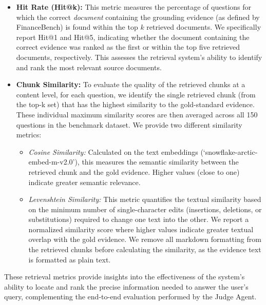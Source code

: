 \documentclass[final,5p,times,twopage,twocolumn,a4paper]{elsarticle}
\begin{document}
\begin{itemize}
    \item \textbf{Hit Rate (Hit@k):} This metric measures the percentage of questions for which the correct \textit{document} containing the grounding evidence (as defined by FinanceBench) is found within the top $k$ retrieved documents. We specifically report Hit@1 and Hit@5, indicating whether the document containing the correct evidence was ranked as the first or within the top five retrieved documents, respectively. This assesses the retrieval system's ability to identify and rank the most relevant source documents.
    \item \textbf{Chunk Similarity:} To evaluate the quality of the retrieved chunks at a content level, for each question, we identify the single retrieved chunk (from the top-k set) that has the highest similarity to the gold-standard evidence. These individual maximum similarity scores are then averaged across all 150 questions in the benchmark dataset. We provide two different similarity metrics:
    \begin{itemize}
        \item \textit{Cosine Similarity:} Calculated on the text embeddings (`snowflake-arctic-embed-m-v2.0'), this measures the semantic similarity between the retrieved chunk and the gold evidence. Higher values (close to one) indicate greater semantic relevance.
        \item \textit{Levenshtein Similarity:} This metric quantifies the textual similarity based on the minimum number of single-character edits (insertions, deletions, or substitutions) required to change one text into the other. We report a normalized similarity score where higher values indicate greater textual overlap with the gold evidence. We remove all markdown formatting from the retrieved chunks before calculating the similarity, as the evidence text is formatted as plain text.
    \end{itemize}
\end{itemize}
%
These retrieval metrics provide insights into the effectiveness of the system's ability to locate and rank the precise information needed to answer the user's query, complementing the end-to-end evaluation performed by the Judge Agent.
\end{document}
